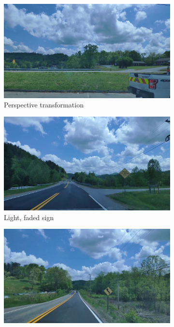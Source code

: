 \begin{figure}
  \begin{center}
    \begin{subfigure}[t]{.49\linewidth}
      \centering
      \includegraphics[width=0.99\linewidth]{figures/examples/sr2/FN/FN_01.png}
      \caption{Perspective transformation}
      \label{fig:perspecFN}
    \end{subfigure}
    \begin{subfigure}[t]{.49\linewidth}
      \centering
      \includegraphics[width=0.99\linewidth]{figures/examples/sr2/FN/FN_02.png}
      \caption{Light, faded sign}
    \end{subfigure}
    \begin{subfigure}[t]{.49\linewidth}
      \centering
      \includegraphics[width=0.99\linewidth]{figures/examples/sr2/FN/FN_03.png}

\end{subfigure}
\end{center}
\end{figure}
